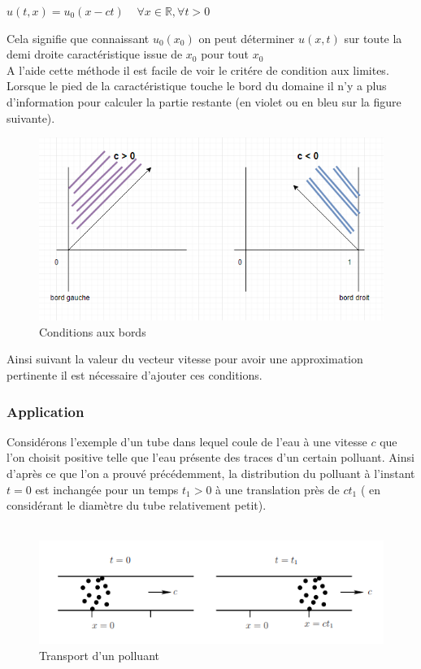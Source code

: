 \documentclass[12pt]{article}
\begin{document}
\begin{center}
        $u(t,x)=u_0(x-ct) \;\;\;\;\forall x\in \mathbb{R}, \forall t>0 $
\end{center}
 Cela signifie que connaissant $u_0(x_0)$ on peut déterminer $u(x,t)$ sur toute la demi droite caractéristique issue de $x_0$ pour tout $x_0$
\\A l'aide cette méthode il est facile de voir le critére de condition aux limites. Lorsque le pied de la caractéristique touche le bord du domaine il n'y a plus d'information pour calculer la partie restante (en violet ou en bleu sur la figure suivante).
\begin{figure}[H]
	\centering
	\includegraphics[scale=0.8]{condition_bord.png}
	\caption{Conditions aux bords}
	\label{1D}
	\end{figure}
Ainsi suivant la valeur du vecteur vitesse pour avoir une approximation pertinente il est nécessaire d'ajouter ces conditions.
\newpage
\subsubsection{Application}
Considérons l'exemple d'un tube dans lequel coule de l'eau à une vitesse $c$ que l'on choisit positive telle que l'eau présente des traces d'un certain polluant. Ainsi d'après ce que l'on a prouvé précédemment, la distribution du polluant à l'instant $t=0$ est inchangée pour un temps $t_1 > 0$ à une translation près de $ct_1$ ( en considérant le diamètre du tube relativement petit).
\\
\\\begin{figure}[H]
	\centering
	\includegraphics[scale=1]{transport_de_polluant.png}
	\caption{Transport d'un polluant}
	\label{1D}
	\end{figure}
	
\end{document}
